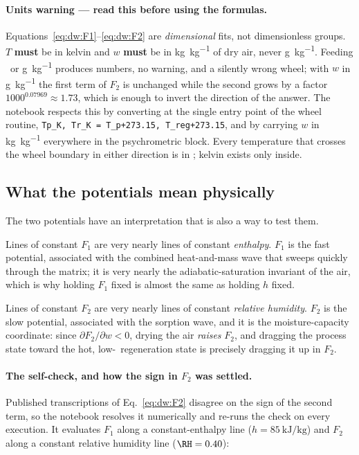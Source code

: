 \paragraph{Units warning --- read this before using the formulas.}
Equations~\eqref{eq:dw:F1}--\eqref{eq:dw:F2} are \emph{dimensional} fits, not
dimensionless groups. $T$ \textbf{must} be in kelvin and $w$ \textbf{must} be
in \si{\kilogram\per\kilogram} of dry air, never \si{\gram\per\kilogram}.
Feeding \degC\ or \si{\gram\per\kilogram} produces numbers, no warning, and a
silently wrong wheel; with $w$ in \si{\gram\per\kilogram} the first term of
$F_2$ is unchanged while the second grows by a factor $1000^{0.07969}\approx
1.73$, which is enough to invert the direction of the answer. The notebook
respects this by converting at the single entry point of the wheel routine,
\texttt{Tp\_K, Tr\_K = T\_p+273.15, T\_reg+273.15}, and by carrying $w$ in
\si{\kilogram\per\kilogram} everywhere in the psychrometric block. Every
temperature that crosses the wheel boundary in either direction is in \degC;
kelvin exists only inside.

\subsection{What the potentials mean physically}
\label{sec:dw:meaning}

The two potentials have an interpretation that is also a way to test them.

Lines of constant $F_1$ are very nearly lines of constant \emph{enthalpy}.
$F_1$ is the fast potential, associated with the combined heat-and-mass wave
that sweeps quickly through the matrix; it is very nearly the
adiabatic-saturation invariant of the air, which is why holding $F_1$ fixed is
almost the same as holding $h$ fixed.

Lines of constant $F_2$ are very nearly lines of constant \emph{relative
humidity}. $F_2$ is the slow potential, associated with the sorption wave, and
it is the moisture-capacity coordinate: since $\partial F_2/\partial w<0$,
drying the air \emph{raises} $F_2$, and dragging the process state toward the
hot, low-\RH\ regeneration state is precisely dragging it up in $F_2$.

\paragraph{The self-check, and how the sign in $F_2$ was settled.}
Published transcriptions of Eq.~\eqref{eq:dw:F2} disagree on the sign of the
second term, so the notebook resolves it numerically and re-runs the check on
every execution. It evaluates $F_1$ along a constant-enthalpy line
($h = \SI{85}{\kilo\joule\per\kilogram}$) and $F_2$ along a constant relative
humidity line ($\RH = 0.40$):


